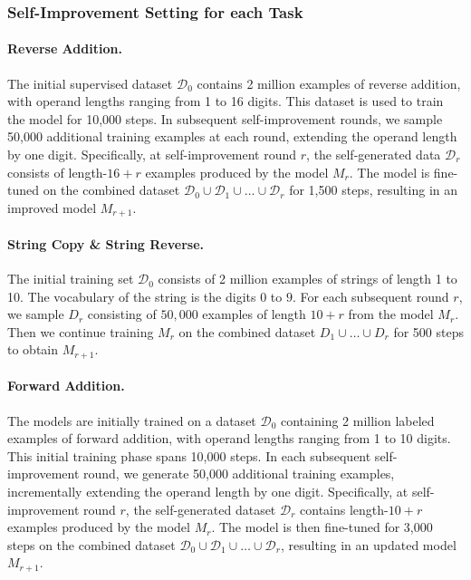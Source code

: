 \subsubsection{Self-Improvement Setting for each Task}

\paragraph{Reverse Addition.} 
The initial supervised dataset $\mathcal{D}_0$ contains 2 million examples of reverse addition, with operand lengths ranging from 1 to 16 digits. This dataset is used to train the model for 10,000 steps. In subsequent self-improvement rounds, we sample 50,000 additional training examples at each round, extending the operand length by one digit. Specifically, at self-improvement round \( r \), the self-generated data $\mathcal{D}_r$ consists of length-\( 16+r \) examples produced by the model \( M_r \). The model is fine-tuned on the combined dataset $\mathcal{D}_0 \cup \mathcal{D}_1 \cup \dots \cup \mathcal{D}_r$ for 1,500 steps, resulting in an improved model \( M_{r+1} \).



\paragraph{String Copy \& String Reverse.} 
The initial training set $\mathcal{D_0}$ consists of 2 million examples of strings of length 1 to 10. The vocabulary of the string is the digits $0$ to $9$. For each subsequent round $r$, we sample $D_{r}$ consisting of $50,000$ examples of length $10+r$ from the model $M_r$. Then we continue training $M_r$ on the combined dataset $D_1\cup\dots\cup D_r$ for 500 steps to obtain $M_{r+1}$. 


\paragraph{Forward Addition.}
The models are initially trained on a dataset $\mathcal{D}_0$ containing 2 million labeled examples of forward addition, with operand lengths ranging from 1 to 10 digits. This initial training phase spans 10,000 steps. In each subsequent self-improvement round, we generate 50,000 additional training examples, incrementally extending the operand length by one digit. Specifically, at self-improvement round \( r \), the self-generated dataset $\mathcal{D}_r$ contains length-\( 10+r \) examples produced by the model \( M_r \). The model is then fine-tuned for 3,000 steps on the combined dataset $\mathcal{D}_0 \cup \mathcal{D}_1 \cup \dots \cup \mathcal{D}_r$, resulting in an updated model \( M_{r+1} \).


